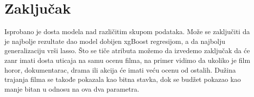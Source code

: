 \documentclass[a4paper]{article}
\begin{document}
\section{Zaključak}
\label{sec:zakljucak}

Isprobano je dosta modela nad različitim skupom podataka. Može se zaključiti da je najbolje rezultate dao model dobijen xgBoost regresijom, a da najbolju generalizaciju vrši lasso. Što se tiče atributa možemo da izvedemo zaključak da će zanr imati dosta uticaja na samu ocenu filma, na primer vidimo da ukoliko je film horor, dokumentarac, drama ili akcija će imati veću ocenu od ostalih. Dužina trajanja filma se takođe pokazala kao bitna stavka, dok se budžet pokazao kao manje bitan u odnosu na ova dva parametra.


\pagebreak

\appendix


\appendix
\end{document}
